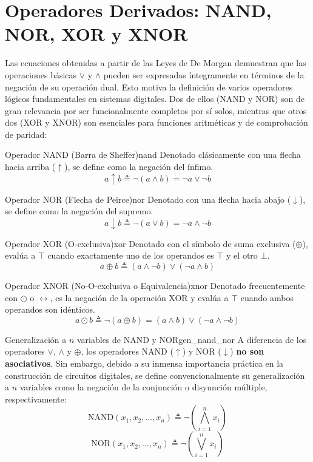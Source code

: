 \chapter{Operadores Derivados: NAND, NOR, XOR y XNOR}
Las ecuaciones obtenidas a partir de las Leyes de De Morgan demuestran que las operaciones básicas $\vee$ y $\wedge$ pueden ser expresadas íntegramente en términos de la negación de su operación dual. Esto motiva la definición de varios operadores lógicos fundamentales en sistemas digitales. Dos de ellos (NAND y NOR) son de gran relevancia por ser funcionalmente completos por sí solos, mientras que otros dos (XOR y XNOR) son esenciales para funciones aritméticas y de comprobación de paridad:

\begin{definicion}{Operador NAND (Barra de Sheffer)}{nand}
Denotado clásicamente con una flecha hacia arriba ($\uparrow$), se define como la negación del ínfimo.
\[ a \uparrow b \triangleq \neg (a \wedge b) = \neg a \vee \neg b \]
\end{definicion}

\begin{definicion}{Operador NOR (Flecha de Peirce)}{nor}
Denotado con una flecha hacia abajo ($\downarrow$), se define como la negación del supremo.
\[ a \downarrow b \triangleq \neg (a \vee b) = \neg a \wedge \neg b \]
\end{definicion}

\begin{definicion}{Operador XOR (O-exclusiva)}{xor}
Denotado con el símbolo de suma exclusiva ($\oplus$), evalúa a $\top$ cuando exactamente uno de los operandos es $\top$ y el otro $\bot$.
\[ a \oplus b \triangleq (a \wedge \neg b) \vee (\neg a \wedge b) \]
\end{definicion}

\begin{definicion}{Operador XNOR (No-O-exclusiva o Equivalencia)}{xnor}
Denotado frecuentemente con $\odot$ o $\leftrightarrow$, es la negación de la operación XOR y evalúa a $\top$ cuando ambos operandos son idénticos.
\[ a \odot b \triangleq \neg (a \oplus b) = (a \wedge b) \vee (\neg a \wedge \neg b) \]
\end{definicion}

\begin{definicion}{Generalización a $n$ variables de NAND y NOR}{gen_nand_nor}
A diferencia de los operadores $\vee$, $\wedge$ y $\oplus$, los operadores NAND ($\uparrow$) y NOR ($\downarrow$) \textbf{no son asociativos}. Sin embargo, debido a su inmensa importancia práctica en la construcción de circuitos digitales, se define convencionalmente su generalización a $n$ variables como la negación de la conjunción o disyunción múltiple, respectivamente:
\[ \text{NAND}(x_1, x_2, \dots, x_n) \triangleq \neg \left( \bigwedge_{i=1}^n x_i \right) \]
\[ \text{NOR}(x_1, x_2, \dots, x_n) \triangleq \neg \left( \bigvee_{i=1}^n x_i \right) \]
\end{definicion}

